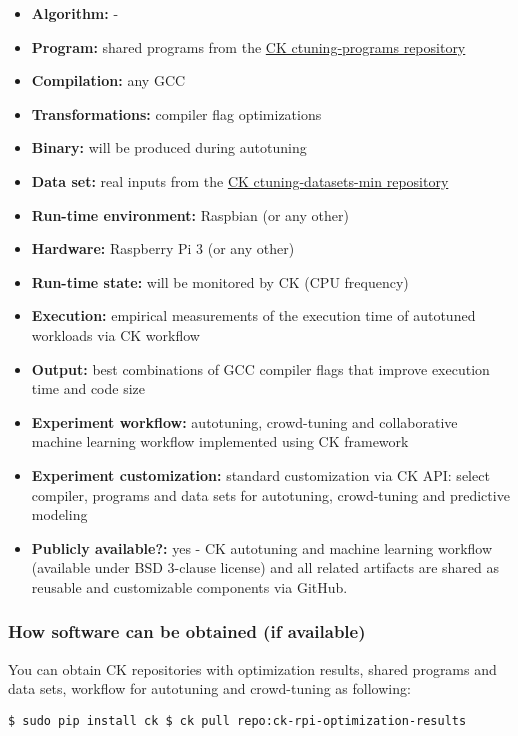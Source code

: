 {\small
\begin{itemize}
  \item {\bf Algorithm:} -
  \item {\bf Program:} shared programs from the \href{https://github.com/ctuning/ctuning-programs}{CK ctuning-programs repository}
  \item {\bf Compilation:} any GCC
  \item {\bf Transformations:} compiler flag optimizations
  \item {\bf Binary:} will be produced during autotuning
  \item {\bf Data set:} real inputs from the \href{https://github.com/ctuning/ctuning-datasets-min}{CK ctuning-datasets-min repository}
  \item {\bf Run-time environment:} Raspbian (or any other)
  \item {\bf Hardware:} Raspberry Pi 3 (or any other)
  \item {\bf Run-time state:} will be monitored by CK (CPU frequency)
  \item {\bf Execution:} empirical measurements of the execution time of autotuned workloads via CK workflow
  \item {\bf Output:} best combinations of GCC compiler flags that improve execution time and code size 
  \item {\bf Experiment workflow:} autotuning, crowd-tuning  and collaborative machine learning workflow implemented using CK framework
  \item {\bf Experiment customization:} standard customization via CK API: select compiler, programs and data sets for autotuning, crowd-tuning and predictive modeling
  \item {\bf Publicly available?:} yes - CK autotuning and machine learning workflow (available under BSD 3-clause license) and all related artifacts are shared as reusable and customizable components via GitHub. 
\end{itemize}
}

\subsubsection{How software can be obtained (if available)}

You can obtain CK repositories with optimization results, shared programs and data sets, workflow for autotuning and crowd-tuning as following:

\begin{flushleft}
\texttt{\$ sudo pip install ck \newline
\$ ck pull repo:ck-rpi-optimization-results}
\end{flushleft}

